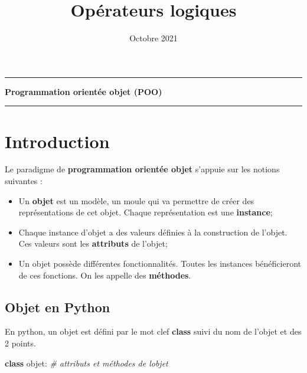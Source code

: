 \documentclass[11pt]{article}
\title{Opérateurs logiques}
\date{Octobre 2021}
\makeatletter
\providecommand{\tightlist}{%
      \setlength{\itemsep}{0pt}\setlength{\parskip}{0pt}}
\newenvironment{Shaded}{}{}
\newcommand{\KeywordTok}[1]{\textcolor[rgb]{0.00,0.44,0.13}{\textbf{{#1}}}}
\newcommand{\CommentTok}[1]{\textcolor[rgb]{0.38,0.63,0.69}{\textit{{#1}}}}
\newcommand{\NormalTok}[1]{{#1}}
\renewcommand\maketitle[1]{
\hrule\medskip
{\raggedright %
\begin{center}
{\Huge \bfseries \sffamily #1 }\\[4ex] 
\hrule \bigskip
\end{center}}} %
\makeatother
\begin{document}
    
    \maketitle{Programmation orientée objet (POO)}
    


    

    \hypertarget{introduction}{%
\section{Introduction}\label{introduction}}

Le paradigme de \textbf{programmation orientée objet} s'appuie sur les
notions suivantes :

\begin{itemize}
\tightlist
\item
  Un \textbf{objet} est un modèle, un moule qui va permettre de créer
  des représentations de cet objet. Chaque représentation est une
  \textbf{instance};
\item
  Chaque instance d'objet a des valeurs définies à la construction de
  l'objet. Ces valeurs sont les \textbf{attributs} de l'objet;
\item
  Un objet possède différentes fonctionnalités. Toutes les instances
  bénéficieront de ces fonctions. On les appelle des \textbf{méthodes}.
\end{itemize}

    \hypertarget{objet-en-python}{%
\subsection{Objet en Python}\label{objet-en-python}}

En python, un objet est défini par le mot clef \textbf{class} suivi du
nom de l'objet et des 2 points.

\begin{Shaded}
\begin{Highlighting}[]
\KeywordTok{class}\NormalTok{ objet:}
    \CommentTok{\# attributs et méthodes de l\textquotesingle{}objet}
\end{Highlighting}
\end{Shaded}
\end{document}
